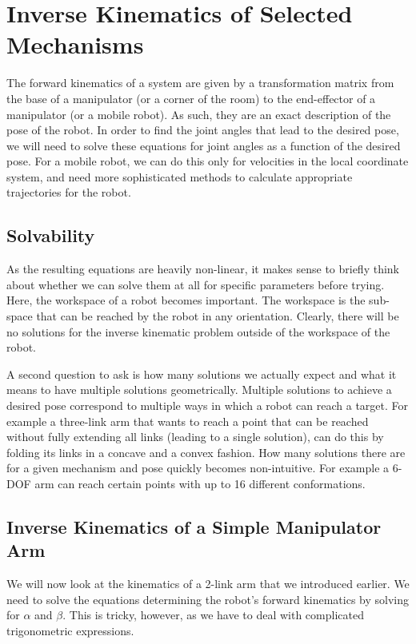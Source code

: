 \section{Inverse Kinematics of Selected Mechanisms}
The forward kinematics of a system are given by a transformation matrix from the base of a manipulator (or a corner of the room) to the end-effector of a manipulator (or a mobile robot). As such, they are an exact description of the pose of the robot. In order to find the joint angles that lead to the desired pose, we will need to solve these equations for joint angles as a function of the desired pose. For a mobile robot, we can do this only for velocities in the local coordinate system, and need more sophisticated methods to calculate appropriate trajectories for the robot. 

\subsection{Solvability}
As the resulting equations are heavily non-linear, it makes sense to briefly think about whether we can solve them at all for specific parameters before trying. Here, the workspace of a robot becomes important. The workspace is the sub-space that can be reached by the robot in any orientation. Clearly, there will be no solutions for the inverse kinematic problem outside of the workspace of the robot.

A second question to ask is how many solutions we actually expect and what it means to have multiple solutions geometrically. Multiple solutions to achieve a desired pose correspond to multiple ways in which a robot can reach a target. For example a three-link arm that wants to reach a point that can be reached without fully extending all links (leading to a single solution), can do this by  folding its links in a concave and a convex fashion. How many solutions there are for a given mechanism and pose quickly becomes non-intuitive. For example a 6-DOF arm can reach certain points with up to 16 different conformations.

\subsection{Inverse Kinematics of a Simple Manipulator Arm}
We will now look at the kinematics of a 2-link arm that we introduced earlier. We need to solve the equations determining the robot's forward kinematics by solving for $ \alpha$ and $ \beta$. This is tricky, however, as we have to deal with complicated trigonometric expressions.

